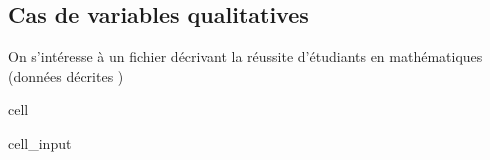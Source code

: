 \documentclass[letterpaper,10pt,french]{sphinxmanual}
\begin{document}
\subsection{Cas de variables qualitatives}
\label{\detokenize{TP1_statsDescriptives:cas-de-variables-qualitatives}}
\sphinxAtStartPar
On s’intéresse à un fichier décrivant la réussite d’étudiants en mathématiques (données décrites )

\begin{sphinxuseclass}{cell}
\begin{sphinxuseclass}{cell_input}
\begin{sphinxVerbatim}[commandchars=\\\{\}]
   
  
\end{sphinxVerbatim}

\end{sphinxuseclass}
\end{sphinxuseclass}
\end{document}

